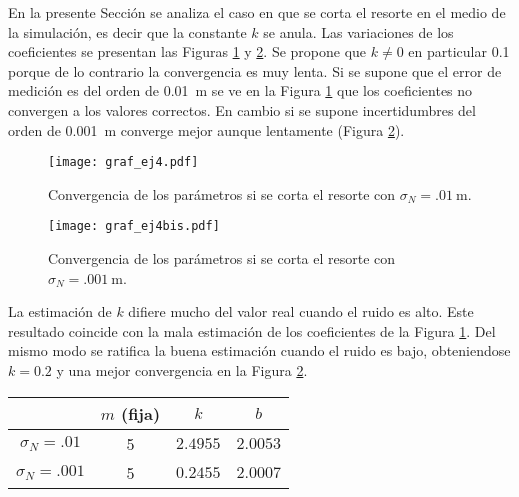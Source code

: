 	En la presente Sección se analiza el caso en que se corta el resorte en el medio de la simulación, es decir que la constante $k$ se anula. Las variaciones de los coeficientes se presentan las Figuras \ref{fig:ej4} y \ref{fig:ej4bis}. 
	Se propone que $k\neq0$ en particular \num{.1} porque de lo contrario la convergencia es muy lenta. Si se supone que el error de medición es del orden de \SI{.01}{\m} se ve en la Figura \ref{fig:ej4} que los coeficientes no convergen a los valores correctos. En cambio si se supone incertidumbres del orden de \SI{0.001}{\m} converge mejor aunque lentamente (Figura \ref{fig:ej4bis}). 

	\begin{figure}[h!]
		\centering
		\texttt{[image: graf\_ej4.pdf]}
		\caption{Convergencia de los parámetros si se corta el resorte con $\sigma_N = \SI{.01}{\m}$.}
		\label{fig:ej4}
	\end{figure}

	\begin{figure}[h!]
		\centering
		\texttt{[image: graf\_ej4bis.pdf]}
		\caption{Convergencia de los parámetros si se corta el resorte con $\sigma_N = \SI{.001}{\m}$.}
		\label{fig:ej4bis}
	\end{figure}


		La estimación de $k$ difiere mucho del valor real cuando el ruido es alto. Este resultado coincide con la mala estimación de los coeficientes de la Figura \ref{fig:ej4}. Del mismo modo se ratifica la buena estimación cuando el ruido es bajo, obteniendose $k=\num{0.2}$ y una mejor convergencia en la Figura \ref{fig:ej4bis}.
		
		\begin{table}[h!]
			\centering
			\begin{tabular}{cccc}
				\toprule
				&$m$ (fija)	& $k$	& $b$\\
				\midrule
				$\sigma_N=\num{.01}$&5&$\num{2.4955}$&$\num{2.0053}$\\
				$\sigma_N=\num{.001}$&5&$\num{0.2455}$&$\num{2.0007}$\\
				\bottomrule
			\end{tabular}
		\end{table}
